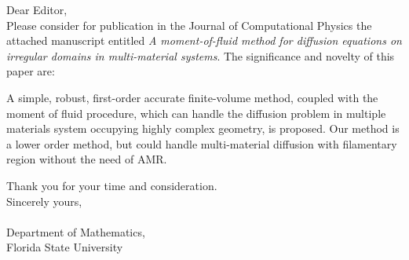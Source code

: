 \documentclass[a4paper,12pt]{article}
\begin{document}
\title {}
\author{}
\date{}

\noindent Dear Editor, \\

Please consider for publication in the Journal of Computational Physics 
the attached manuscript entitled {\em A moment-of-fluid method for diffusion equations on irregular domains in multi-material systems}. 
The significance and novelty of this paper are: \par 

A simple, robust, first-order accurate finite-volume method, coupled with the moment of fluid procedure, which can handle the diffusion problem in multiple materials system occupying highly complex geometry, is proposed. Our method is a lower order method, but could handle multi-material diffusion with filamentary region without the need of AMR.


  

Thank you for your time and consideration. \\
Sincerely yours,\\

\noindent   \\ %
Department of Mathematics, \\
Florida State University
\end{document}
